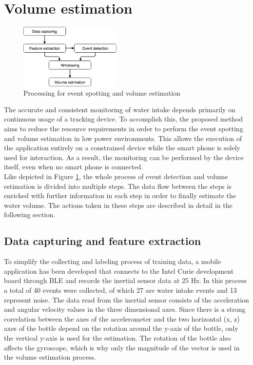 \section{Volume estimation}
\begin{figure}
\centering
  \includegraphics[width=0.45\textwidth]{assets/workflow.png}
\caption{Processing for event spotting and volume estimation}
\label{fig:workflow}
\end{figure}
The accurate and consistent monitoring of water intake depends primarily on continuous usage of a tracking device. To accomplish this, the proposed method aims to reduce the resource requirements in order to perform the event spotting and volume estimation in low power environments. This allows the execution of the application entirely on a constrained device while the smart phone is solely used for interaction. As a result, the monitoring can be performed by the device itself, even when no smart phone is connected.\\
Like depicted in Figure \ref{fig:workflow}, the whole process of event detection and volume estimation is divided into multiple steps. The data flow between the steps is enriched with further information in each step in order to finally estimate the water volume. The actions taken in these steps are described in detail in the following section.


\subsection{Data capturing and feature extraction}
To simplify the collecting and labeling process of training data, a mobile application has been developed that connects to the Intel Curie development board \cite{Supportf64:online} through BLE and records the inertial sensor data at 25 Hz. In this process a total of 40 events were collected, of which 27 are water intake events and 13 represent noise. The data read from the inertial sensor consists of the acceleration and angular velocity values in the three dimensional axes. Since there is a strong correlation between the axes of the accelerometer and the two horizontal (x, z) axes of the bottle depend on the rotation around the y-axis of the bottle, only the vertical y-axis is used for the estimation. The rotation of the bottle also affects the gyroscope, which is why only the magnitude of the vector is used in the volume estimation process.\\

